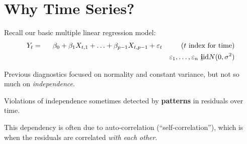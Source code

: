 \documentclass[12pt]{notes}
\begin{document}

\section{Why Time Series?}
Recall our basic multiple linear regression model:
\begin{eqnarray}
  Y_t & = & \beta_0 + \beta_1 X_{t,1} + \ldots + \beta_{p-1} X_{t,p-1} + \varepsilon_t  \mbox{ \hspace{2em}  ($t$ index for time)} \nonumber\\
  & & \mbox{ \hspace{17em}} \varepsilon_1, \ldots, \varepsilon_n \mbox{ {\bf \underline{i}}id} N(0,\sigma^2) \nonumber
\end{eqnarray}

Previous diagnostics focused on normality and constant variance, but not so much on \textit{independence}. 

\vspace{1em}
Violations of independence sometimes detected by \textbf{patterns} in residuals over time. 

\vspace{1em}
This dependency is often due to auto-correlation (``self-correlation''), which is when the residuals are correlated \textit{with each other}. 


\begin{minipage}[l][2cm][c]{\textwidth}

\end{minipage}


\begin{minipage}[l][3cm][c]{\textwidth}

\end{minipage}
\end{document}
